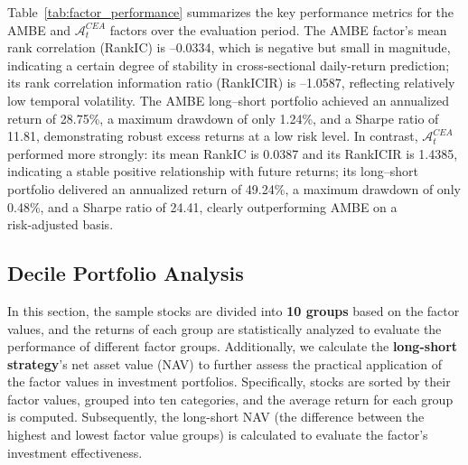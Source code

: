 \documentclass[preprint,12pt,authoryear]{elsarticle}
\begin{document}
Table~\ref{tab:factor_performance} summarizes the key performance metrics for the AMBE and \(\mathcal{A}^{CEA}_t\) factors over the evaluation period.
The AMBE factor's mean rank correlation (RankIC) is –0.0334, which is negative but small in magnitude, indicating a certain degree of stability in cross‑sectional daily‑return prediction; its rank correlation information ratio (RankICIR) is –1.0587, reflecting relatively low temporal volatility. The AMBE long–short portfolio achieved an annualized return of 28.75\%, a maximum drawdown of only 1.24\%, and a Sharpe ratio of 11.81, demonstrating robust excess returns at a low risk level.
In contrast, \(\mathcal{A}^{CEA}_t\) performed more strongly: its mean RankIC is 0.0387 and its RankICIR is 1.4385, indicating a stable positive relationship with future returns; its long–short portfolio delivered an annualized return of 49.24\%, a maximum drawdown of only 0.48\%, and a Sharpe ratio of 24.41, clearly outperforming AMBE on a risk‑adjusted basis.

\begin{table}[ht]
  \centering
  \caption{Summary of Factor Performance Metrics}
  \label{tab:factor_performance}
\end{table}

\subsection{ Decile Portfolio Analysis}
In this section, the sample stocks are divided into \textbf{10 groups} based on the factor values, and the returns of each group are statistically analyzed to evaluate the performance of different factor groups. Additionally, we calculate the \textbf{long-short strategy}'s net asset value (NAV) to further assess the practical application of the factor values in investment portfolios. Specifically, stocks are sorted by their factor values, grouped into ten categories, and the average return for each group is computed. Subsequently, the long-short NAV (the difference between the highest and lowest factor value groups) is calculated to evaluate the factor's investment effectiveness.
\end{document}
